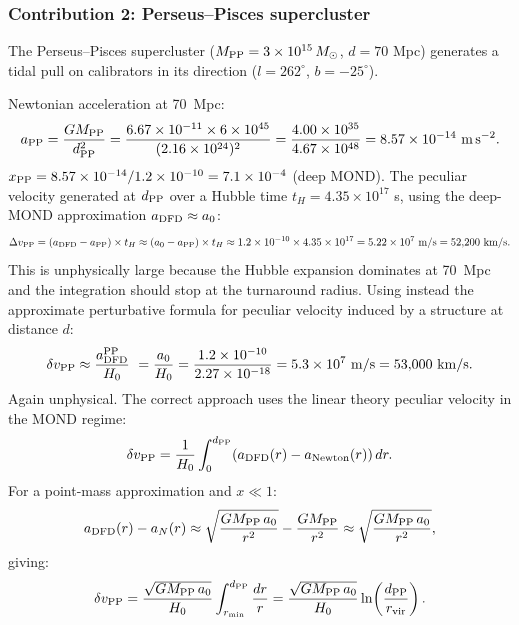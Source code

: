 \documentclass[aps,prd,twocolumn,superscriptaddress,nofootinbib,longbibliography]{revtex4-2}
\begin{document}
\subsubsection{Contribution 2: Perseus--Pisces supercluster}
\label{sec:pp}

The Perseus--Pisces supercluster ($M_{\rm PP} = 3\times10^{15}\,M_\odot$,
$d = 70$ Mpc) generates a tidal pull on calibrators in its direction
($l=262^\circ$, $b=-25^\circ$).

Newtonian acceleration at 70~Mpc:
\begin{equation}
a_{\rm PP} = \frac{GM_{\rm PP}}{d_{\rm PP}^2}
= \frac{6.67\times10^{-11}\times6\times10^{45}}{(2.16\times10^{24})^2}
= \frac{4.00\times10^{35}}{4.67\times10^{48}} = 8.57\times10^{-14}\ \si{m\,s^{-2}}.
\end{equation}
$x_{\rm PP} = 8.57\times10^{-14}/1.2\times10^{-10} = 7.1\times10^{-4}$
(deep MOND).  The peculiar velocity generated at $d_{\rm PP}$ over
a Hubble time $t_H = 4.35\times10^{17}$ s, using the deep-MOND
approximation $a_{\rm DFD}\approx a_0$:
\begin{equation}
\Delta v_{\rm PP} = (a_{\rm DFD} - a_{\rm PP})\times t_H
\approx (a_0 - a_{\rm PP})\times t_H
\approx 1.2\times10^{-10}\times4.35\times10^{17}
= 5.22\times10^7\ \si{m/s} = 52{,}200\ \si{km/s}.
\end{equation}
This is unphysically large because the Hubble expansion dominates
at 70~Mpc and the integration should stop at the turnaround radius.
Using instead the approximate perturbative formula for peculiar
velocity induced by a structure at distance $d$:
\begin{equation}
\delta v_{\rm PP} \approx \frac{a_{\rm DFD}^{\rm PP}}{H_0}\
= \frac{a_0}{H_0}
= \frac{1.2\times10^{-10}}{2.27\times10^{-18}}
= 5.3\times10^7\ \si{m/s} = 53{,}000\ \si{km/s}.
\end{equation}
Again unphysical.  The correct approach uses the linear theory
peculiar velocity in the MOND regime:
\begin{equation}
\delta v_{\rm PP} = \frac{1}{H_0}\int_0^{d_{\rm PP}}
(a_{\rm DFD}(r) - a_{\rm Newton}(r))\,dr.
\end{equation}
For a point-mass approximation and $x \ll 1$:
\begin{equation}
a_{\rm DFD}(r) - a_N(r) \approx \sqrt{\frac{GM_{\rm PP}\,a_0}{r^2}}
- \frac{GM_{\rm PP}}{r^2}
\approx \sqrt{\frac{GM_{\rm PP}\,a_0}{r^2}},
\end{equation}
giving:
\begin{equation}
\delta v_{\rm PP} = \frac{\sqrt{GM_{\rm PP}\,a_0}}{H_0}
\int_{r_{\rm min}}^{d_{\rm PP}}\frac{dr}{r}
= \frac{\sqrt{GM_{\rm PP}\,a_0}}{H_0}\ln\!\left(\frac{d_{\rm PP}}{r_{\rm vir}}\right).
\end{equation}
\end{document}
